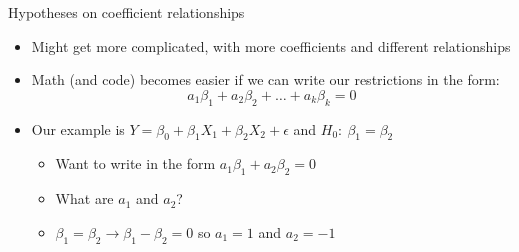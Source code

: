\documentclass[aspectratio=169]{beamer}
\begin{document}
\begin{frame}{Hypotheses on coefficient relationships}
    \begin{itemize}
        \item Might get more complicated, with more coefficients and different relationships
        \item Math (and code) becomes easier if we can write our restrictions in the form:
        $$
        a_1 \beta_1 + a_2 \beta_2 + \dots + a_k \beta_k = 0
        $$
        \item Our example is $Y = \beta_0 + \beta_1 X_1 + \beta_2 X_2 + \epsilon $ and $ H_0: ~ \beta_1 = \beta_2$
        \begin{itemize}
            \item Want to write in the form $a_1 \beta_1 + a_2 \beta_2 = 0$
            \item What are $a_1$ and $a_2$?
            \pause
            \item $ \beta_1 = \beta_2 \rightarrow \beta_1 - \beta_2 = 0$ so $a_1 = 1$ and $a_2 = -1$
        \end{itemize}
    \end{itemize}
\end{frame}
\end{document}

